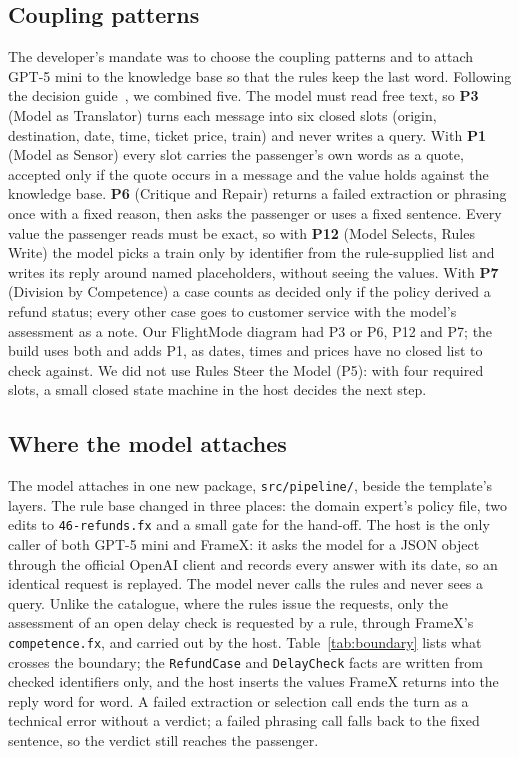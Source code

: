 
\subsection{Coupling patterns}
\label{sec:patterns}

The developer's mandate was to choose the coupling patterns and to attach GPT-5 mini to the knowledge base so that the rules keep the last word. Following the decision guide~\citep{handschuh2026patterns}, we combined five. The model must read free text, so \textbf{P3} (Model as Translator) turns each message into six closed slots (origin, destination, date, time, ticket price, train) and never writes a query. With \textbf{P1} (Model as Sensor) every slot carries the passenger's own words as a quote, accepted only if the quote occurs in a message and the value holds against the knowledge base. \textbf{P6} (Critique and Repair) returns a failed extraction or phrasing once with a fixed reason, then asks the passenger or uses a fixed sentence. Every value the passenger reads must be exact, so with \textbf{P12} (Model Selects, Rules Write) the model picks a train only by identifier from the rule-supplied list and writes its reply around named placeholders, without seeing the values. With \textbf{P7} (Division by Competence) a case counts as decided only if the policy derived a refund status; every other case goes to customer service with the model's assessment as a note. Our FlightMode diagram had P3 or P6, P12 and P7; the build uses both and adds P1, as dates, times and prices have no closed list to check against. We did not use Rules Steer the Model (P5): with four required slots, a small closed state machine in the host decides the next step.

\subsection{Where the model attaches}
\label{sec:attach}

The model attaches in one new package, \texttt{src/pipeline/}, beside the template's layers. The rule base changed in three places: the domain expert's policy file, two edits to \texttt{46-refunds.fx} and a small gate for the hand-off. The host is the only caller of both GPT-5 mini and FrameX: it asks the model for a JSON object through the official OpenAI client and records every answer with its date, so an identical request is replayed. The model never calls the rules and never sees a query. Unlike the catalogue, where the rules issue the requests, only the assessment of an open delay check is requested by a rule, through FrameX's \texttt{competence.fx}, and carried out by the host. Table~\ref{tab:boundary} lists what crosses the boundary; the \texttt{RefundCase} and \texttt{DelayCheck} facts are written from checked identifiers only, and the host inserts the values FrameX returns into the reply word for word. A failed extraction or selection call ends the turn as a technical error without a verdict; a failed phrasing call falls back to the fixed sentence, so the verdict still reaches the passenger.

